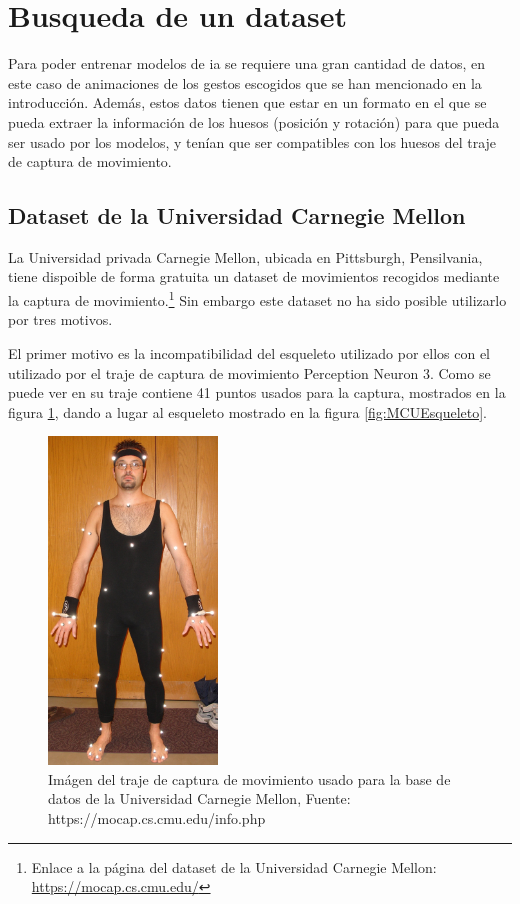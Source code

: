 \section{Busqueda de un dataset}
\label{sec:busquedaDataset}
Para poder entrenar modelos de \gls{ia} se requiere una gran cantidad de datos, en este caso de animaciones de los gestos escogidos que se han mencionado en la introducción. 
Además, estos datos tienen que estar en un formato en el que se pueda extraer la información de los huesos (posición y rotación) para que pueda ser usado por los modelos, y tenían que ser compatibles con los huesos del traje de captura de movimiento.

\subsection{Dataset de la Universidad Carnegie Mellon}
La Universidad privada Carnegie Mellon, ubicada en Pittsburgh, Pensilvania, tiene dispoible de forma gratuita un dataset de movimientos recogidos mediante la captura de movimiento.\footnote{Enlace a la página del dataset de la Universidad Carnegie Mellon: \url{https://mocap.cs.cmu.edu/}}
Sin embargo este dataset no ha sido posible utilizarlo por tres motivos.

El primer motivo es la incompatibilidad del esqueleto utilizado por ellos con el utilizado por el traje de captura de movimiento Perception Neuron 3.
Como se puede ver en \cite{MCUINFO} su traje contiene 41 puntos usados para la captura, mostrados en la figura \ref{fig:MCUTraje}, dando a lugar al esqueleto mostrado en la figura \ref{fig:MCUEsqueleto}.

\begin{figure}[H]
    \centering
    \includegraphics[width=0.4\textwidth]{Imagenes/Bitmap/MCUTraje.jpg}
    \caption{Imágen del traje de captura de movimiento usado para la base de datos de la Universidad Carnegie Mellon, Fuente: https://mocap.cs.cmu.edu/info.php}
    \label{fig:MCUTraje}
\end{figure}

